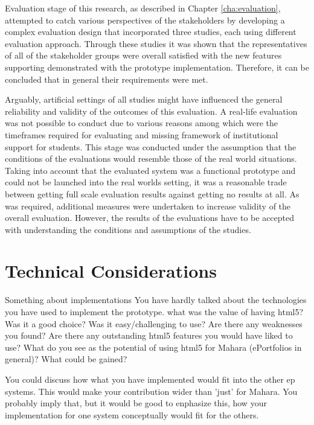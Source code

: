 
Evaluation stage of this research, as described in Chapter \ref{cha:evaluation},
attempted to catch various perspectives of the stakeholders by developing a
complex evaluation design that incorporated three studies, each using different
evaluation approach. Through these studies it was shown that the representatives
of all of the stakeholder groups were overall satisfied with the new features
supporting \LLLs demonstrated with the prototype implementation. Therefore, it
can be concluded that in general their requirements were met.

Arguably, artificial settings of all studies might have influenced the general
reliability and validity of the outcomes of this evaluation. A real-life
evaluation was not possible to conduct due to various reasons among which were
the timeframes required for evaluating \LLLs and missing framework of
institutional support for students. This stage was conducted under the
assumption that the conditions of the evaluations would resemble those of the
real world situations. Taking into account that the evaluated system was a
functional prototype and could not be launched into the real worlds setting, it
was a reasonable trade between getting full scale evaluation results against
getting no results at all. As was required, additional measures were undertaken
to increase validity of the overall evaluation. However, the results of the
evaluations have to be accepted with understanding the conditions and
assumptions of the studies.

\section{Technical Considerations}
Something about implementations
You have hardly talked about the technologies you have used to implement the
prototype. what was the value of having html5? Was it a good choice? Was it
easy/challenging to use? Are there any weaknesses you found? Are there any
outstanding html5 features you would have liked to use? What do you see as the
potential of using html5 for Mahara (ePortfolios in general)? What could be
gained?

You could discuss how what you have implemented would fit into the other ep
systems. This would make your contribution wider than 'just' for Mahara. You
probably imply that, but it would be good to enphasize this, how your
implementation for one system conceptually would fit for the others.

